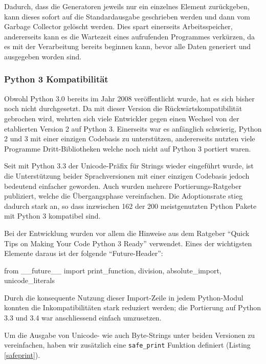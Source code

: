 
Dadurch, dass die Generatoren jeweils nur ein einzelnes Element zurückgeben,
kann dieses sofort auf die Standardausgabe geschrieben werden und dann vom
Garbage Collector gelöscht werden. Dies spart einerseits Arbeitsspeicher,
andererseits kann es die Wartezeit eines aufrufenden Programmes verkürzen, da es
mit der Verarbeitung bereits beginnen kann, bevor alle Daten generiert und
ausgegeben worden sind.

\subsubsection{Python 3 Kompatibilität}

Obwohl Python 3.0 bereits im Jahr 2008 veröffentlicht wurde, hat es sich bisher
noch nicht durchgesetzt. Da mit dieser Version
die Rückwärtskompatibilität gebrochen wird, wehrten sich viele Entwickler
gegen einen Wechsel von der etablierten Version 2 auf Python 3. Einerseits
war es anfänglich schwierig, Python 2 und 3 mit einer einzigen Codebasis zu
unterstützen, andererseits nutzten viele Programme Dritt-Bibliotheken welche
noch nicht auf Python 3 portiert waren.

Seit mit Python 3.3 der Unicode-Präfix für Strings wieder eingeführt
wurde\cite{PEP414:2012}, ist die Unterstützung beider Sprachversionen mit einer
einzigen Codebasis jedoch bedeutend einfacher geworden. Auch wurden mehrere
Portierungs-Ratgeber publiziert, welche die Übergangsphase
vereinfachen\cite{regebro2013porting, ronacher2013porting}. Die Adoptionsrate
stieg dadurch stark an, so dass inzwischen 162 der 200 meistgenutzten Python
Pakete mit Python 3 kompatibel sind\cite{py3adoption}.

Bei der Entwicklung wurden vor allem die Hinweise aus dem Ratgeber
\enquote{Quick Tips on Making Your Code Python 3 Ready}\cite{deshev2012porting}
verwendet. Eines der wichtigsten Elemente daraus ist der folgende
\enquote{Future-Header}:

\begin{pythoncode}
from __future__ import print_function, division, absolute_import, unicode_literals
\end{pythoncode}

Durch die konsequente Nutzung dieser Import-Zeile in jedem Python-Modul konnten
die Inkompatibilitäten stark reduziert werden; die Portierung auf Python 3.3 und
3.4 war anschliessend einfach umzusetzen.

Um die Ausgabe von Unicode- wie auch Byte-Strings unter beiden Versionen zu
vereinfachen, haben wir zusätzlich eine \texttt{safe\_print} Funktion definiert
(Listing \ref{safeprint}).

